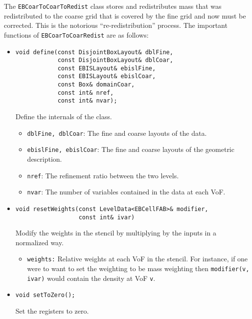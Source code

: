 The {\tt EBCoarToCoarToRedist} class stores and redistributes mass
that was redistributed to the coarse grid that is covered by the 
fine grid and now must be corrected.  This is the notorious
``re-redistribution'' process.
The important functions of {\tt EBCoarToCoarRedist} are as follows:
\begin{itemize}
\item \begin{small}\begin{verbatim}
void define(const DisjointBoxLayout& dblFine,
            const DisjointBoxLayout& dblCoar,
            const EBISLayout& ebislFine,
            const EBISLayout& ebislCoar,
            const Box& domainCoar,
            const int& nref,
            const int& nvar);
\end{verbatim}\end{small}
Define the internals of the class. 
\begin{itemize}
\item {\tt dblFine, dblCoar}: The fine and coarse layouts
        of the data.
\item {\tt ebislFine, ebislCoar}: The fine and coarse layouts
        of the geometric description.
\item {\tt nref}: The refinement ratio between the two levels.
\item {\tt nvar}: The number of variables contained in the data
        at each VoF.
\end{itemize}

\item \begin{small}\begin{verbatim}
void resetWeights(const LevelData<EBCellFAB>& modifier,
                  const int& ivar)
\end{verbatim}\end{small}
Modify the weights in the stencil by multiplying by
the inputs in a normalized way.
\begin{itemize}
\item {\tt weights:}  Relative weights at each VoF in the
stencil.  For instance, if one were to want to set the 
weighting to be mass weighting then {\tt modifier(v, ivar)}
would contain the density at VoF {\tt v}.
\end{itemize}

\item \begin{small}\begin{verbatim}
void setToZero();
\end{verbatim}\end{small}
Set the registers to zero.


\end{itemize}
